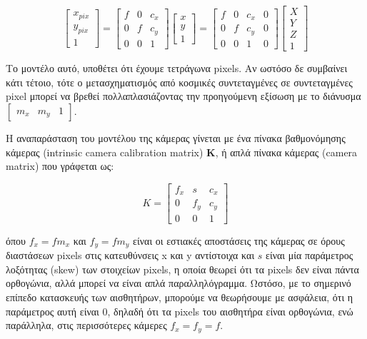 \begin{equation}
\begin{bmatrix}
x_{pix}\\y_{pix}\\1
\end{bmatrix}
=
\begin{bmatrix}
f & 0 & c_{x} \\
0 & f & c_{y} \\
0 & 0 & 1 
\end{bmatrix}
\begin{bmatrix}
x\\
y\\
1
\end{bmatrix}
=
\begin{bmatrix}
f & 0 & c_{x} & 0\\
0 & f & c_{y} & 0\\
0 & 0 & 1 & 0
\end{bmatrix}
\begin{bmatrix}
X\\
Y\\
Z\\
1
\end{bmatrix}
\end{equation}




Το μοντέλο αυτό, υποθέτει ότι έχουμε τετράγωνα pixels. Αν ωστόσο δε συμβαίνει κάτι τέτοιο, τότε ο μετασχηματισμός από κοσμικές συντεταγμένες σε συντεταγμένες pixel μπορεί να βρεθεί πολλαπλασιάζοντας την προηγούμενη εξίσωση με το διάνυσμα $\begin{bmatrix}m_{x} & m_{y} & 1\end{bmatrix}$. 


Η αναπαράσταση του μοντέλου της κάμερας γίνεται με ένα πίνακα βαθμονόμησης κάμερας (intrinsic camera calibration matrix) $\mathbf{K}$, ή απλά πίνακα κάμερας (camera matrix) που γράφεται ως:


\begin{equation}
K=
\begin{bmatrix}
f_{x} & s & c_{x}\\
0 & f_{y} & c_{y}\\
0 & 0 & 1
\end{bmatrix}
\end{equation}

όπου $f_{x}=fm_{x}$ και $f_{y}=fm_{y}$ είναι οι εστιακές αποστάσεις της κάμερας σε όρους διαστάσεων pixels στις κατευθύνσεις x και y αντίστοιχα και $s$ είναι μία παράμετρος λοξότητας (skew) των στοιχείων pixels, η οποία θεωρεί ότι τα pixels δεν είναι πάντα ορθογώνια, αλλά μπορεί να είναι απλά παραλληλόγραμμα. Ωστόσο, με το σημερινό επίπεδο κατασκευής των αισθητήρων, μπορούμε να θεωρήσουμε με ασφάλεια, ότι η παράμετρος αυτή είναι 0, δηλαδή ότι τα pixels του αισθητήρα είναι ορθογώνια, ενώ παράλληλα, στις περισσότερες κάμερες $f_{x}=f_{y}=f$. 


